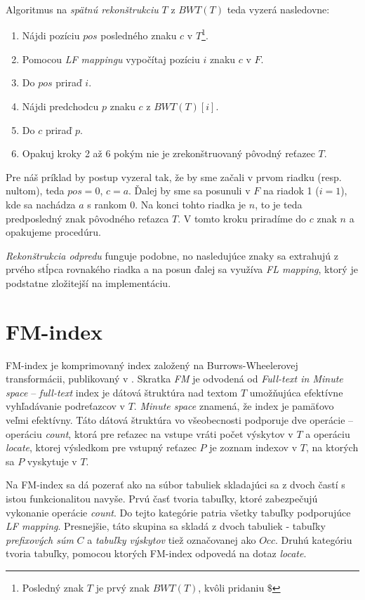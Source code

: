     Algoritmus na \emph{spätnú rekonštrukciu} $T$ z $BWT(T)$ teda vyzerá nasledovne:
    
    \begin{enumerate}
        \item{Nájdi pozíciu $pos$ posledného znaku $c$ v $T$\footnote{Posledný znak $T$ je prvý znak $BWT(T)$, kvôli pridaniu $\$$}.}
        \item{Pomocou \emph{LF mappingu} vypočítaj pozíciu $i$ znaku $c$ v $F$.}
        \item{Do $pos$ priraď $i$.}
        \item{Nájdi predchodcu $p$ znaku $c$ z $BWT(T)[i]$.}
        \item{Do $c$ priraď $p$.}
        \item{Opakuj kroky 2 až 6 pokým nie je zrekonštruovaný pôvodný reťazec $T$.}
    \end{enumerate}
    
    Pre náš príklad by postup vyzeral tak, že by sme začali v prvom riadku (resp. nultom), teda $pos = 0$, $c = a$. Ďalej by sme sa posunuli v $F$ na riadok 1 ($i = 1$), kde sa nachádza $a$ s rankom 0. Na konci tohto riadka je $n$, to je teda predposledný znak pôvodného reťazca $T$. V tomto kroku priradíme do $c$ znak $n$ a opakujeme procedúru.
    
    \emph{Rekonštrukcia odpredu} funguje podobne, no nasledujúce znaky sa extrahujú z prvého stĺpca rovnakého riadka a na posun ďalej sa využíva \emph{FL mapping}, ktorý je podstatne zložitejší na implementáciu.
    
    
\section{FM-index}
\label{sec:fm_index}
    FM-index je komprimovaný index založený na Burrows-Wheelerovej transformácii, publikovaný v \cite{FM00}. Skratka \emph{FM} je odvodená od \emph{Full-text in Minute space} -- \emph{full-text} index je dátová štruktúra nad textom $T$ umožňujúca efektívne vyhľadávanie podreťazcov v $T$. \emph{Minute space} znamená, že index je pamäťovo veľmi efektívny. Táto dátová štruktúra vo všeobecnosti podporuje dve operácie -- operáciu \emph{count}, ktorá pre reťazec na vstupe vráti počet výskytov v $T$ a operáciu \emph{locate}, ktorej výsledkom pre vstupný reťazec $P$ je zoznam indexov v $T$, na ktorých sa $P$ vyskytuje v $T$.
    
    Na FM-index sa dá pozerať ako na súbor tabuliek skladajúci sa z dvoch častí s istou funkcionalitou navyše. Prvú časť tvoria tabuľky, ktoré zabezpečujú vykonanie operácie \emph{count}. Do tejto kategórie patria všetky tabuľky podporujúce \emph{LF mapping}. Presnejšie, táto skupina sa skladá z dvoch tabuliek - tabuľky \emph{prefixových súm} $C$ a \emph{tabuľky výskytov} tiež označovanej ako $Occ$. Druhú kategóriu tvoria tabuľky, pomocou ktorých FM-index odpovedá na dotaz \emph{locate}.
    
